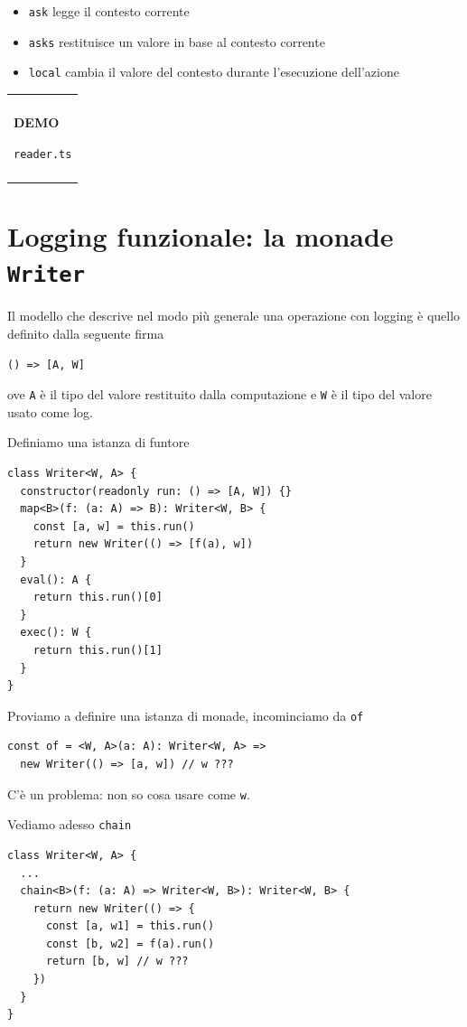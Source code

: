 \documentclass[12pt]{article}
\newenvironment{demo}
    {\begin{center}
    \begin{tabular}{|p{0.9\textwidth}|}
    \hline\\
    }
    {
    \\\\\hline
    \end{tabular}
    \end{center}
    }
\begin{document}
\begin{itemize}
  \item \texttt{ask} legge il contesto corrente
  \item \texttt{asks} restituisce un valore in base al contesto corrente
  \item \texttt{local} cambia il valore del contesto durante l'esecuzione dell'azione
\end{itemize}

\begin{demo}
\begin{center}
\textbf{DEMO}

\texttt{reader.ts}
\end{center}
\end{demo}

\newpage

\section{Logging funzionale: la monade \texttt{Writer}}

Il modello che descrive nel modo più generale una operazione con logging è quello definito dalla seguente firma

\begin{verbatim}
() => [A, W]
\end{verbatim}

ove \texttt{A} è il tipo del valore restituito dalla computazione e \texttt{W} è il tipo del valore usato come log.

Definiamo una istanza di funtore

\begin{verbatim}
class Writer<W, A> {
  constructor(readonly run: () => [A, W]) {}
  map<B>(f: (a: A) => B): Writer<W, B> {
    const [a, w] = this.run()
    return new Writer(() => [f(a), w])
  }
  eval(): A {
    return this.run()[0]
  }
  exec(): W {
    return this.run()[1]
  }
}
\end{verbatim}

Proviamo a definire una istanza di monade, incominciamo da \texttt{of}

\begin{verbatim}
const of = <W, A>(a: A): Writer<W, A> =>
  new Writer(() => [a, w]) // w ???
\end{verbatim}

C'è un problema: non so cosa usare come \texttt{w}.

Vediamo adesso \texttt{chain}

\begin{verbatim}
class Writer<W, A> {
  ...
  chain<B>(f: (a: A) => Writer<W, B>): Writer<W, B> {
    return new Writer(() => {
      const [a, w1] = this.run()
      const [b, w2] = f(a).run()
      return [b, w] // w ???
    })
  }
}
\end{verbatim}
\end{document}
